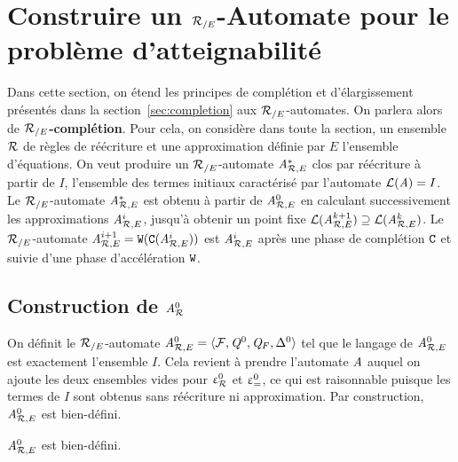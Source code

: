 

\section{Construire un ${\mathcal R_{/E}}$-Automate pour le problème d'atteignabilité}


Dans cette section, on étend les principes de complétion et d'élargissement
présentés dans la section~\ref{sec:completion} aux ${\mathcal R_{/E}}$-automates. On parlera 
alors de \textbf{${\mathcal R_{/E}}$-complétion}. Pour cela, on considère dans toute la section,
un ensemble $\mathcal R$ de règles de réécriture et une approximation définie par $E$ l'ensemble d'équations.
On veut produire un ${\mathcal R_{/E}}$-automate $\mathit A^*_{\mathcal R,E}$  clos par réécriture à partir de $I$,
l'ensemble des termes initiaux caractérisé par l'automate $\mathcal{L}(\mathit A) = I$.
Le ${\mathcal R_{/E}}$-automate $\mathit A^*_{\mathcal R,E}$ est obtenu à partir de ${\mathit A}_{\mathcal R,E}^0$ en calculant
successivement les approximations ${\mathit A}_{\mathcal R,E}^i$, jusqu'à obtenir un point fixe
$\mathcal{L}({\mathit A}_{\mathcal R,E}^{k+1}) \supseteq \mathcal{L}({\mathit A}_{\mathcal R,E}^{k})$. Le ${\mathcal R_{/E}}$-automate ${\mathit A}_{\mathcal R,E}^{i+1}=\mathtt{W}(\mathtt{C}({\mathit A}_{\mathcal R,E}^i))$
est ${\mathit A}_{\mathcal R,E}^i$ après une phase de complétion $\mathtt{C}$ et suivie d'une phase d'accélération $\mathtt{W}$.


\subsection{Construction de ${\mathit A}_{\mathcal R}^0$}

On définit le ${\mathcal R_{/E}}$-automate ${\mathit A}_{\mathcal R,E}^0 = \langle \mathcal{F}, \mathit Q^0, \mathit Q_F, \Delta^0\rangle$ tel que
le langage de ${\mathit A}_{\mathcal R,E}^0$ est exactement l'ensemble $I$. Cela revient à prendre 
l'automate $\mathit A$ auquel on ajoute les deux ensembles vides pour $\upvarepsilon_{\mathcal R}^0$ et $\upvarepsilon_{=}^0$, ce qui
est raisonnable puisque les termes de $I$ sont obtenus sans réécriture ni approximation.
Par construction, ${\mathit A}_{\mathcal R,E}^0$ est bien-défini.

\begin{property}
  ${\mathit A}_{\mathcal R,E}^0$ est bien-défini.
\end{property}

